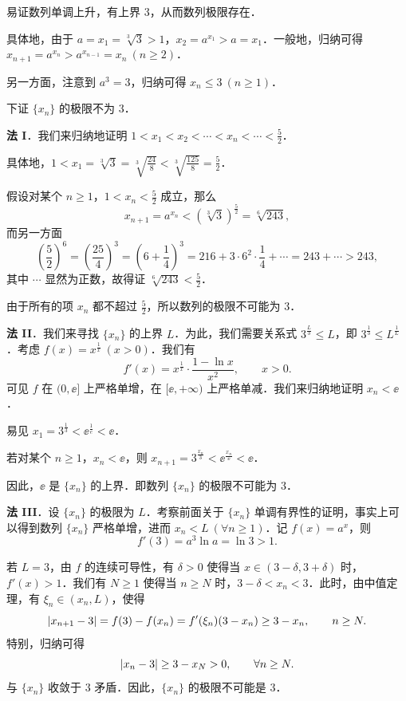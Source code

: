 \begin{solution}
易证数列单调上升，有上界 $3$，从而数列极限存在．

具体地，由于 $a=x_{1}=\sqrt[3]{3}>1$，$x_{2}=a^{x_{1}}>a=x_{1}$．一般地，归纳可得 $x_{n+1}=a^{x_{n}}>a^{x_{n-1}}=x_{n}\ (n\ge 2)$．

另一方面，注意到 $a^{3}=3$，归纳可得 $x_{n}\le 3\ (n\ge 1)$．

下证 $\{x_{n}\}$ 的极限不为 $3$．

\textbf{法 I}．我们来归纳地证明 $1<x_{1}<x_{2}<\cdots<x_{n}<\cdots<\frac52$．

具体地，$1<x_{1}=\sqrt[3]{3}=\sqrt[3]{\frac{24}{8}}<\sqrt[3]{\frac{125}{8}}=\frac52$．

假设对某个 $n\ge 1$，$1<x_{n}<\frac52$ 成立，那么
\[
x_{n+1}=a^{x_{n}}<\left(\sqrt[3]{3}\right)^{\frac52}=\sqrt[6]{243},
\]
而另一方面
\[
\left(\frac52\right)^{6}=\left(\frac{25}{4}\right)^{3}=\left(6+\frac14\right)^{3}=216+3\cdot 6^{2}\cdot\frac14+\cdots=243+\cdots>243,
\]
其中 $\cdots$ 显然为正数，故得证 $\sqrt[6]{243}<\frac52$．

由于所有的项 $x_{n}$ 都不超过 $\frac52$，所以数列的极限不可能为 $3$．

\textbf{法 II}．我们来寻找 $\{x_{n}\}$ 的上界 $L$．为此，我们需要关系式 $3^{\frac{L}{3}}\le L$，即 $3^{\frac13}\le L^{\frac1L}$．考虑 $f(x)=x^{\frac1x}\ (x>0)$．我们有
\[
f'(x)=x^{\frac1x}\cdot\frac{1-\ln x}{x^{2}},\qquad x>0.
\]
可见 $f$ 在 $(0,\ee]$ 上严格单增，在 $[\ee,+\infty)$ 上严格单减．我们来归纳地证明 $x_{n}<\ee$．

易见 $x_{1}=3^{\frac13}<\ee^{\frac1e}<\ee$．

若对某个 $n\ge 1$，$x_{n}<\ee$，则 $x_{n+1}=3^{\frac{x_{n}}{3}}<\ee^{\frac{x_{n}}{\ee}}<\ee$．

因此，$\ee$ 是 $\{x_{n}\}$ 的上界．即数列 $\{x_{n}\}$ 的极限不可能为 $3$．

\textbf{法 III}．设 $\{x_{n}\}$ 的极限为 $L$．考察前面关于 $\{x_{n}\}$ 单调有界性的证明，事实上可以得到数列 $\{x_{n}\}$ 严格单增，进而 $x_{n}<L\ (\forall n\ge 1)$．记 $f(x)=a^{x}$，则
\[
f'(3)=a^{3}\ln a=\ln 3>1.
\]

若 $L=3$，由 $f$ 的连续可导性，有 $\delta>0$ 使得当 $x\in(3-\delta,3+\delta)$ 时，$f'(x)>1$．我们有 $N\ge 1$ 使得当 $n\ge N$ 时，$3-\delta<x_{n}<3$．此时，由中值定理，有 $\xi_{n}\in(x_{n},L)$，使得
\[
\left|x_{n+1}-3\right|=f(3)-f(x_{n})=f'(\xi_{n})(3-x_{n})\ge 3-x_{n},\qquad n\ge N.
\]
特别，归纳可得
\[
\left|x_{n}-3\right|\ge 3-x_{N}>0,\qquad \forall n\ge N.
\]
与 $\{x_{n}\}$ 收敛于 $3$ 矛盾．因此，$\{x_{n}\}$ 的极限不可能是 $3$．
\end{solution}
